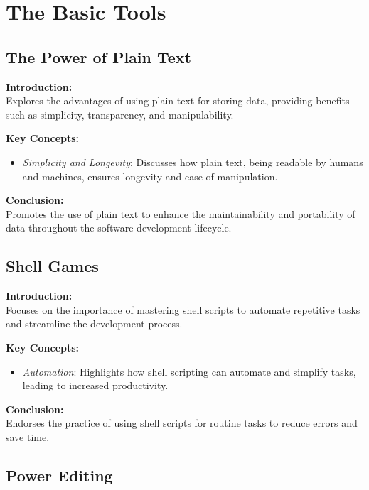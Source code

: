 \section{The Basic Tools}

\subsection{The Power of Plain Text}

\textbf{Introduction:} \\
Explores the advantages of using plain text for storing data, providing benefits such as simplicity, transparency, and manipulability.

\vspace{2mm}
\noindent\textbf{Key Concepts:}
\begin{itemize}
  \item \textit{Simplicity and Longevity}: Discusses how plain text, being readable by humans and machines, ensures longevity and ease of manipulation.
\end{itemize}

\vspace{2mm}
\noindent\textbf{Conclusion:} \\
Promotes the use of plain text to enhance the maintainability and portability of data throughout the software development lifecycle.

\subsection{Shell Games}

\textbf{Introduction:} \\
Focuses on the importance of mastering shell scripts to automate repetitive tasks and streamline the development process.

\vspace{2mm}
\noindent\textbf{Key Concepts:}
\begin{itemize}
  \item \textit{Automation}: Highlights how shell scripting can automate and simplify tasks, leading to increased productivity.
\end{itemize}

\vspace{2mm}
\noindent\textbf{Conclusion:} \\
Endorses the practice of using shell scripts for routine tasks to reduce errors and save time.

\subsection{Power Editing}

